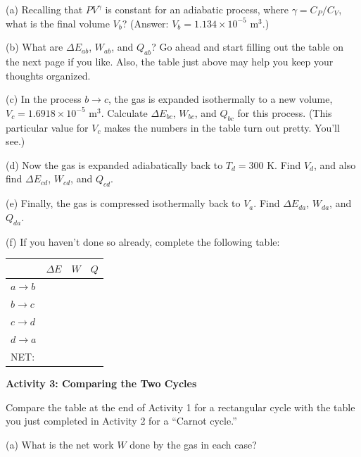 (a) Recalling that $PV^\gamma$ is constant for an adiabatic process, where $\gamma = C_P / C_V$, what is the final volume $V_b$?  (Answer: $V_b=1.134 \times 10^{-5}$ m$^3$.)  
\vspace{1.8in}

(b) What are $\Delta E_{ab}$, $W_{ab}$, and $Q_{ab}$?  Go ahead and start filling out the table on the next page if you like.  Also, the table just above may help you keep your thoughts organized.
\vspace{1.8in}

\pagebreak
(c) In the process $b \rightarrow c$, the gas is expanded isothermally to a new volume, $V_c=1.6918 \times 10^{-5}$ m$^3$.  Calculate $\Delta E_{bc}$, $W_{bc}$, and $Q_{bc}$ for this process.  (This particular value for $V_c$ makes the numbers in the table turn out pretty.  You’ll see.)
\vspace{1.6in}

(d) Now the gas is expanded adiabatically back to $T_d=300$ K.  Find $V_d$, and also find  $\Delta E_{cd}$, $W_{cd}$, and $Q_{cd}$.
\vspace{2.0in}


(e) Finally, the gas is compressed isothermally back to $V_a$.  Find $\Delta E_{da}$, $W_{da}$, and $Q_{da}$.  
\vspace{1.6in}



(f) If you haven’t done so already, complete the following table:
\vspace{0.1 in}

\renewcommand{\arraystretch}{2.0}
\begin{tabular}{| C{1in} |C{1in} | C{1in} | C{1in} |}
\hline
& $\Delta E$ & $W$ & $Q$ \\ \hline
$a \rightarrow b$ & & & \\ \hline
$b \rightarrow c$ & & & \\ \hline
$c \rightarrow d$ & & & \\ \hline
$d \rightarrow a$ & & & \\ \hline
\hline
NET: & & & \\ \hline
\end{tabular}
\renewcommand{\arraystretch}{1.0}

\pagebreak
\textbf{Activity 3: Comparing the Two Cycles}

Compare the table at the end of Activity 1 for a rectangular cycle with the table you just completed in Activity 2 for a ``Carnot cycle.'' 

(a)  What is the net work $W$ done by the gas in each case?

